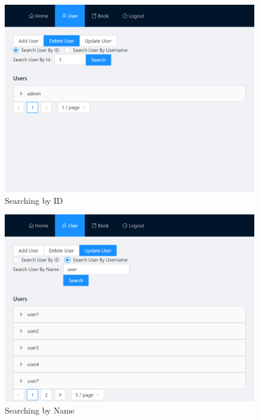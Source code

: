 \begin{minipage}{.49\textwidth}
  \begin{figure}[H]
    \centering
    \includegraphics[width=\linewidth]{img/front-end/user-delete-id-search.png}
    \caption{Searching by ID}
  \end{figure}
\end{minipage}
\begin{minipage}{.49\textwidth}
  \begin{figure}[H]
    \centering
    \includegraphics[width=\linewidth]{img/front-end/user-update-name-search.png}
    \caption{Searching by Name}
  \end{figure}
\end{minipage}

